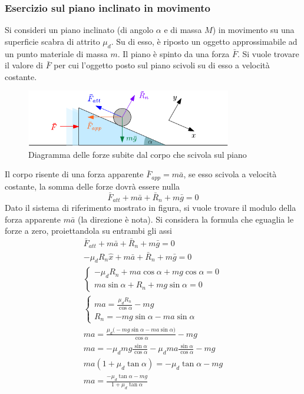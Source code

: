 \documentclass[10pt, letterpaper]{report}
\begin{document}
\subsubsection{Esercizio sul piano inclinato in movimento}
Si consideri un piano inclinato (di angolo $\alpha$ e di massa $M$) in movimento  su una superficie scabra di attrito $\mu_d$.
Su di esso, è riposto un oggetto approssimabile ad un punto materiale di massa $m$. Il piano è spinto da una 
forza $\bar F$. Si vuole trovare il valore di $\bar F$ per cui l'oggetto posto sul piano scivoli su di esso a velocità 
costante.\begin{figure}[h!]
    \centering
    \includegraphics[width=0.8\textwidth]{images/pianoInMovimento.pdf}
    \caption{Diagramma delle forze subite dal corpo che scivola sul piano}
\end{figure}
Il corpo risente di una forza apparente $\bar F_{app}=m\bar a$, se esso scivola a velocità costante, la somma delle forze dovrà 
essere nulla 
$$ \bar F_{att}+m\bar a+\bar R_n+m\bar g=0$$
Dato il sistema di riferimento mostrato in figura, si vuole trovare il modulo della forza apparente $m\bar a$ (la direzione è nota). Si considera la formula che eguaglia le forze a zero, proiettandola su entrambi gli assi 
\begin{eqnarray}
\bar F_{att}+m\bar a+\bar R_n +m\bar g = 0\\ 
-\mu_dR_n\hat x+m\bar a+\bar R_n +m\bar g = 0\\
\begin{cases}
    -\mu_dR_n+ma\cos\alpha+mg\cos\alpha=0\\ 
    ma\sin\alpha+R_n+mg\sin\alpha=0
\end{cases}\\ 
\begin{cases}
    ma=\frac{\mu_dR_n}{\cos\alpha}-mg\\ 
    R_n=-mg\sin\alpha-ma\sin\alpha 
\end{cases}\\ 
ma=\frac{\mu_d\Big(-mg\sin\alpha-ma\sin\alpha \Big)}{\cos\alpha}-mg\\ 
ma=-\mu_dmg\frac{\sin\alpha}{\cos\alpha}-\mu_dma\frac{\sin\alpha}{\cos\alpha}-mg \\ 
ma(1+\mu_d\tan\alpha)=-\mu_d\tan\alpha-mg\\ 
ma=\frac{-\mu_d\tan\alpha-mg}{1+\mu_d\tan\alpha}
\end{eqnarray}
\end{document}
